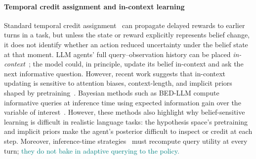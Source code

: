 \documentclass[11pt]{article}
\newcommand{\nk}[1]{\textcolor{teal}{#1}}
\theoremstyle{plain}
\theoremstyle{definition}
\theoremstyle{remark}
\begin{document}
\vspace*{-3mm}
\paragraph{Temporal credit assignment and in-context learning}
Standard temporal credit assignment~\citep{barto2003recent,schulman2017proximalpolicyoptimizationalgorithms,shao2024deepseekmath,sutton1984temporal} can propagate delayed rewards to earlier turns in a task, but unless the state or reward explicitly represents belief change, it does not identify whether an action reduced uncertainty under the belief state at that moment.
LLM agents' full query--observation history can be placed \textit{in-context}~\citep{brown2020language,olsson2022context}; the model could, in principle, update its belief in-context and ask the next informative question. However, recent work suggests that in-context updating is sensitive to attention biases, context-length, and implicit priors shaped by pretraining~\citep{kossen2024incontext,liu-etal-2024-lost, falck2024context}. Bayesian methods such as BED-LLM compute informative queries at inference time using expected information gain over the variable of interest~\citep{choudhury2025bed,echarghaoui2026balar,hu2026playing20questiongame,mazzaccara-etal-2024-learning,zhang-etal-2024-probing}. However, these methods also highlight why belief-sensitive learning is difficult in realistic language tasks: the hypothesis space's pretraining and implicit priors make the agent's posterior difficult to inspect or credit at each step. Moreover, inference-time strategies~\citep{jeong2025reflectthenplan,yao2022react} must recompute query utility at every turn; \nk{they do not bake in adaptive querying to the policy.}

 

\vspace*{-3mm}
\end{document}
